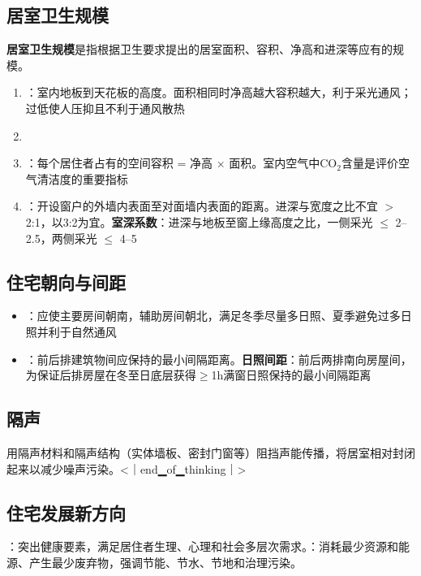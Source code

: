 \documentclass[10pt,a4paper,oneside]{ctexbook}
\begin{document}
\subsection{居室卫生规模}

\textbf{居室卫生规模}是指根据卫生要求提出的居室面积、容积、净高和进深等应有的规模。

\begin{enumerate}[leftmargin=*]
    \item {}：室内地板到天花板的高度。面积相同时净高越大容积越大，利于采光通风；过低使人压抑且不利于通风散热
    \item {}
    \item {}：每个居住者占有的空间容积 = 净高 $\times$ 面积。室内空气中CO$_2$含量是评价空气清洁度的重要指标
    \item {}：开设窗户的外墙内表面至对面墙内表面的距离。进深与宽度之比不宜 $>$ 2:1，以3:2为宜。\textbf{室深系数}：进深与地板至窗上缘高度之比，一侧采光 $\leq$ 2--2.5，两侧采光 $\leq$ 4--5
\end{enumerate}

\subsection{住宅朝向与间距}

\begin{itemize}[leftmargin=*]
    \item {}：应使主要房间朝南，辅助房间朝北，满足冬季尽量多日照、夏季避免过多日照并利于自然通风
    \item {}：前后排建筑物间应保持的最小间隔距离。\textbf{日照间距}：前后两排南向房屋间，为保证后排房屋在冬至日底层获得$\geq$1h满窗日照保持的最小间隔距离
\end{itemize}

\subsection{隔声}

用隔声材料和隔声结构（实体墙板、密封门窗等）阻挡声能传播，将居室相对封闭起来以减少噪声污染。<｜end▁of▁thinking｜>

\subsection{住宅发展新方向}
：突出健康要素，满足居住者生理、心理和社会多层次需求。：消耗最少资源和能源、产生最少废弃物，强调节能、节水、节地和治理污染。
\end{document}
